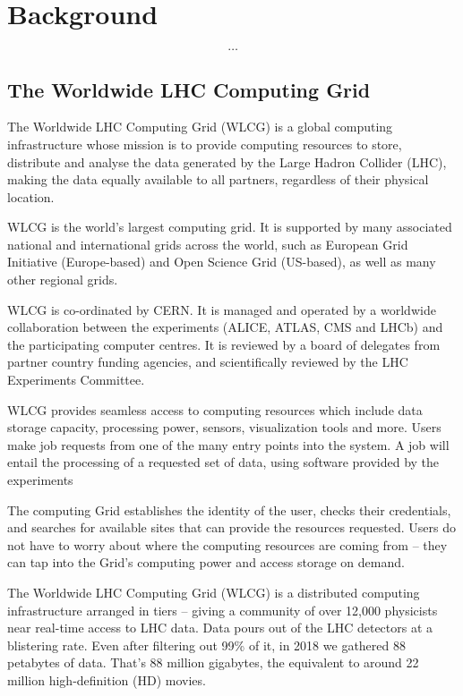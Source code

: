\section{Background}

$$\dots$$



\subsection{The Worldwide LHC Computing Grid}

The Worldwide LHC Computing Grid (WLCG) is a global computing infrastructure whose mission is to provide computing resources to store, distribute and analyse the data generated by the Large Hadron Collider (LHC), making the data equally available to all partners, regardless of their physical location.

WLCG is the world's largest computing grid. It is supported by many associated national and international grids across the world, such as European Grid Initiative (Europe-based) and Open Science Grid (US-based), as well as many other regional grids.

WLCG is co-ordinated by CERN. It is managed and operated by a worldwide collaboration between the experiments (ALICE, ATLAS, CMS and LHCb) and the participating computer centres. It is reviewed by a board of delegates from partner country funding agencies, and scientifically reviewed by the LHC Experiments Committee.

WLCG provides seamless access to computing resources which include data storage capacity, processing power, sensors, visualization tools and more. Users make job requests from one of the many entry points into the system. A job will entail the processing of a requested set of data, using software provided by the experiments

The computing Grid establishes the identity of the user, checks their credentials, and searches for available sites that can provide the resources requested. Users do not have to worry about where the computing resources are coming from – they can tap into the Grid's computing power and access storage on demand.


The Worldwide LHC Computing Grid (WLCG) is a distributed computing infrastructure arranged in tiers – giving a community of over 12,000 physicists near real-time access to LHC data. Data pours out of the LHC detectors at a blistering rate. Even after filtering out 99\% of it, in 2018 we gathered 88 petabytes of data. That's 88 million gigabytes, the equivalent to around 22 million high-definition (HD) movies.


